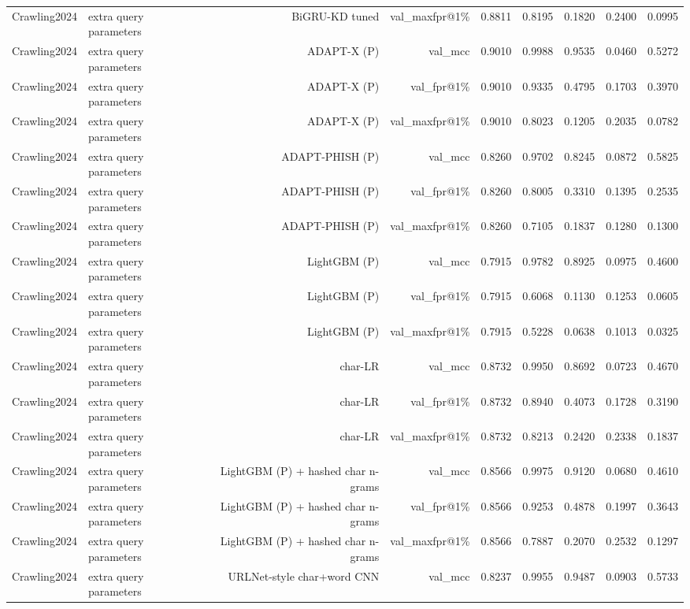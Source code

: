 \begin{table}[t]
\begin{tabular}{llrrrrrrr}
Crawling2024 & extra query parameters & BiGRU-KD tuned & val\_maxfpr@1\% & 0.8811 & 0.8195 & 0.1820 & 0.2400 & 0.0995 \\
Crawling2024 & extra query parameters & ADAPT-X (P) & val\_mcc & 0.9010 & 0.9988 & 0.9535 & 0.0460 & 0.5272 \\
Crawling2024 & extra query parameters & ADAPT-X (P) & val\_fpr@1\% & 0.9010 & 0.9335 & 0.4795 & 0.1703 & 0.3970 \\
Crawling2024 & extra query parameters & ADAPT-X (P) & val\_maxfpr@1\% & 0.9010 & 0.8023 & 0.1205 & 0.2035 & 0.0782 \\
Crawling2024 & extra query parameters & ADAPT-PHISH (P) & val\_mcc & 0.8260 & 0.9702 & 0.8245 & 0.0872 & 0.5825 \\
Crawling2024 & extra query parameters & ADAPT-PHISH (P) & val\_fpr@1\% & 0.8260 & 0.8005 & 0.3310 & 0.1395 & 0.2535 \\
Crawling2024 & extra query parameters & ADAPT-PHISH (P) & val\_maxfpr@1\% & 0.8260 & 0.7105 & 0.1837 & 0.1280 & 0.1300 \\
Crawling2024 & extra query parameters & LightGBM (P) & val\_mcc & 0.7915 & 0.9782 & 0.8925 & 0.0975 & 0.4600 \\
Crawling2024 & extra query parameters & LightGBM (P) & val\_fpr@1\% & 0.7915 & 0.6068 & 0.1130 & 0.1253 & 0.0605 \\
Crawling2024 & extra query parameters & LightGBM (P) & val\_maxfpr@1\% & 0.7915 & 0.5228 & 0.0638 & 0.1013 & 0.0325 \\
Crawling2024 & extra query parameters & char-LR & val\_mcc & 0.8732 & 0.9950 & 0.8692 & 0.0723 & 0.4670 \\
Crawling2024 & extra query parameters & char-LR & val\_fpr@1\% & 0.8732 & 0.8940 & 0.4073 & 0.1728 & 0.3190 \\
Crawling2024 & extra query parameters & char-LR & val\_maxfpr@1\% & 0.8732 & 0.8213 & 0.2420 & 0.2338 & 0.1837 \\
Crawling2024 & extra query parameters & LightGBM (P) + hashed char n-grams & val\_mcc & 0.8566 & 0.9975 & 0.9120 & 0.0680 & 0.4610 \\
Crawling2024 & extra query parameters & LightGBM (P) + hashed char n-grams & val\_fpr@1\% & 0.8566 & 0.9253 & 0.4878 & 0.1997 & 0.3643 \\
Crawling2024 & extra query parameters & LightGBM (P) + hashed char n-grams & val\_maxfpr@1\% & 0.8566 & 0.7887 & 0.2070 & 0.2532 & 0.1297 \\
Crawling2024 & extra query parameters & URLNet-style char+word CNN & val\_mcc & 0.8237 & 0.9955 & 0.9487 & 0.0903 & 0.5733 \\

\end{tabular}
\end{table}
